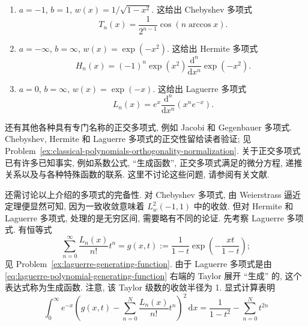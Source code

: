 \begin{enumerate}
\item $a=-1$, $b=1$, $w(x)=1/\sqrt{1-x^2}$. 这给出 Chebyshev 多项式
\begin{equation}\label{eq:chebyshev-polynomial-cosine-formula}
T_n(x)=\dfrac1{2^{n-1}}\cos(n\arccos x).
\end{equation}

\item $a=-\infty$, $b=\infty$, $w(x)=\exp(-x^2)$. 这给出 Hermite 多项式
\begin{equation}\label{eq:hermite-polynomial-rodrigues-formula}
H_n(x)=(-1)^n\exp(x^2)\dfrac{\mathrm{d}^n}{\mathrm{d}x^n}\exp(-x^2).
\end{equation}

\item $a=0$, $b=\infty$, $w(x)=\exp(-x)$. 这给出 Laguerre 多项式
\begin{equation}\label{eq:laguerre-polynomial-rodrigues-formula}
L_n(x)=e^x\dfrac{\mathrm{d}^n}{\mathrm{d}x^n}(x^ne^{-x}).
\end{equation}
\end{enumerate}

还有其他各种具有专门名称的正交多项式, 例如 Jacobi 和 Gegenbauer 多项式. Chebyshev, Hermite 和 Laguerre 多项式的正交性留给读者验证; 见 Problem~\ref{ex:classical-polynomials-orthogonality-normalization}. 关于正交多项式已有许多已知事实, 例如系数公式, ``生成函数'', 正交多项式满足的微分方程, 递推关系以及与各种特殊函数的联系. 这里不讨论这些问题, 请参阅有关文献.

还需讨论以上介绍的多项式的完备性. 对 Chebyshev 多项式, 由 Weierstrass 逼近定理便显然可知, 因为一致收敛意味着 $L_w^2(-1,1)$ 中的收敛. 但对 Hermite 和 Laguerre 多项式, 处理的是无穷区间, 需要略有不同的论证. 先考察 Laguerre 多项式. 有恒等式
\begin{equation}\label{eq:laguerre-polynomial-generating-function}
\sum_{n=0}^\infty\dfrac{L_n(x)}{n!}t^n=g(x,t):=\dfrac1{1-t}\exp\left(-\dfrac{xt}{1-t}\right);
\end{equation}
见 Problem~\ref{ex:laguerre-generating-function}. 由于 Laguerre 多项式是由 \eqref{eq:laguerre-polynomial-generating-function} 右端的 Taylor 展开 ``生成'' 的, 这个表达式称为生成函数. 注意, 该 Taylor 级数的收敛半径为 1. 显式计算表明
\begin{equation}\label{eq:laguerre-generating-function-lp-two-remainder}
\int_0^\infty e^{-x}\left(g(x,t)-\sum_{n=0}^N\dfrac{L_n(x)}{n!}t^n\right)^2\,\mathrm{d}x=\dfrac1{1-t^2}-\sum_{n=0}^N t^{2n}
\end{equation}


